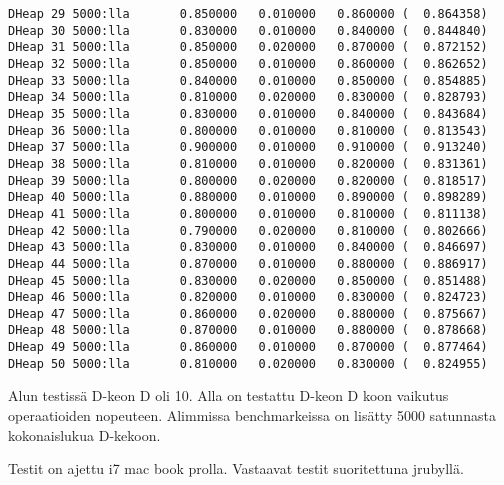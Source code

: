 \documentclass[a4paper,12pt]{article}
\begin{document}
\begin{verbatim}
DHeap 29 5000:lla       0.850000   0.010000   0.860000 (  0.864358)
DHeap 30 5000:lla       0.830000   0.010000   0.840000 (  0.844840)
DHeap 31 5000:lla       0.850000   0.020000   0.870000 (  0.872152)
DHeap 32 5000:lla       0.850000   0.010000   0.860000 (  0.862652)
DHeap 33 5000:lla       0.840000   0.010000   0.850000 (  0.854885)
DHeap 34 5000:lla       0.810000   0.020000   0.830000 (  0.828793)
DHeap 35 5000:lla       0.830000   0.010000   0.840000 (  0.843684)
DHeap 36 5000:lla       0.800000   0.010000   0.810000 (  0.813543)
DHeap 37 5000:lla       0.900000   0.010000   0.910000 (  0.913240)
DHeap 38 5000:lla       0.810000   0.010000   0.820000 (  0.831361)
DHeap 39 5000:lla       0.800000   0.020000   0.820000 (  0.818517)
DHeap 40 5000:lla       0.880000   0.010000   0.890000 (  0.898289)
DHeap 41 5000:lla       0.800000   0.010000   0.810000 (  0.811138)
DHeap 42 5000:lla       0.790000   0.020000   0.810000 (  0.802666)
DHeap 43 5000:lla       0.830000   0.010000   0.840000 (  0.846697)
DHeap 44 5000:lla       0.870000   0.010000   0.880000 (  0.886917)
DHeap 45 5000:lla       0.830000   0.020000   0.850000 (  0.851488)
DHeap 46 5000:lla       0.820000   0.010000   0.830000 (  0.824723)
DHeap 47 5000:lla       0.860000   0.020000   0.880000 (  0.875667)
DHeap 48 5000:lla       0.870000   0.010000   0.880000 (  0.878668)
DHeap 49 5000:lla       0.860000   0.010000   0.870000 (  0.877464)
DHeap 50 5000:lla       0.810000   0.020000   0.830000 (  0.824955)
\end{verbatim} 
\normalsize
Alun testissä  D-keon D oli 10. Alla on testattu D-keon D koon vaikutus operaatioiden nopeuteen. Alimmissa benchmarkeissa on lisätty 5000 satunnasta kokonaislukua D-kekoon.

Testit on ajettu i7 mac book prolla.
\newpage
Vastaavat testit suoritettuna jrubyllä.
\end{document}
